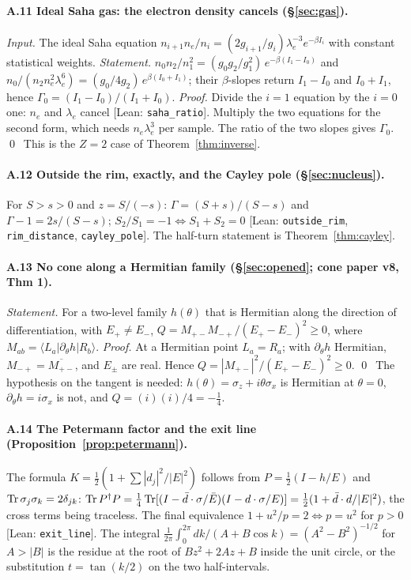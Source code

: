 \paragraph{A.11 Ideal Saha gas: the electron density cancels (§\ref{sec:gas}).}
\emph{Input.} The ideal Saha equation $n_{i+1}n_e/n_i=(2g_{i+1}/g_i)\lambda_e^{-3}e^{-\beta I_i}$ with constant statistical weights.
\emph{Statement.} $n_0n_2/n_1^2=(g_0g_2/g_1^2)\,e^{-\beta(I_1-I_0)}$ and $n_0/(n_2n_e^2\lambda_e^6)=(g_0/4g_2)\,e^{\beta(I_0+I_1)}$; their $\beta$-slopes return $I_1-I_0$ and $I_0+I_1$, hence $\Gamma_0=(I_1-I_0)/(I_1+I_0)$.
\emph{Proof.} Divide the $i=1$ equation by the $i=0$ one: $n_e$ and $\lambda_e$ cancel \textsf{[Lean: \texttt{saha\_ratio}]}. Multiply the two equations for the second form, which needs $n_e\lambda_e^3$ per sample. The ratio of the two slopes gives $\Gamma_0$. \qed\ This is the $Z=2$ case of Theorem~\ref{thm:inverse}.

\paragraph{A.12 Outside the rim, exactly, and the Cayley pole (§\ref{sec:nucleus}).}
For $S>s>0$ and $z=S/(-s)$: $\Gamma=(S+s)/(S-s)$ and $\Gamma-1=2s/(S-s)$; $S_2/S_1=-1\iff S_1+S_2=0$ \textsf{[Lean: \texttt{outside\_rim}, \texttt{rim\_distance}, \texttt{cayley\_pole}]}. The half-turn statement is Theorem~\ref{thm:cayley}.

\paragraph{A.13 No cone along a Hermitian family (§\ref{sec:opened}; cone paper v8, Thm 1).}
\emph{Statement.} For a two-level family $h(\theta)$ that is Hermitian along the direction of differentiation, with $E_+\ne E_-$, $Q=M_{+-}M_{-+}/(E_+-E_-)^2\ge0$, where $M_{ab}=\langle L_a|\partial_\theta h|R_b\rangle$.
\emph{Proof.} At a Hermitian point $L_a=R_a$; with $\partial_\theta h$ Hermitian, $M_{-+}=\overline{M_{+-}}$, and $E_\pm$ are real. Hence $Q=|M_{+-}|^2/(E_+-E_-)^2\ge0$. \qed\ The hypothesis on the tangent is needed: $h(\theta)=\sigma_z+i\theta\sigma_x$ is Hermitian at $\theta=0$, $\partial_\theta h=i\sigma_x$ is not, and $Q=(i)(i)/4=-\tfrac14$.

\paragraph{A.14 The Petermann factor and the exit line (Proposition~\ref{prop:petermann}).}
The formula $K=\tfrac12(1+\sum|d_j|^2/|E|^2)$ follows from $P=\tfrac12(I-h/E)$ and $\operatorname{Tr}\sigma_j\sigma_k=2\delta_{jk}$: $\operatorname{Tr} P^\dagger P=\tfrac14\operatorname{Tr}[(I-\bar d\cdot\sigma/\bar E)(I-d\cdot\sigma/E)]=\tfrac12(1+\bar d\cdot d/|E|^2)$, the cross terms being traceless. The final equivalence $1+u^2/p=2\iff p=u^2$ for $p>0$ \textsf{[Lean: \texttt{exit\_line}]}. The integral $\frac1{2\pi}\int_0^{2\pi}dk/(A+B\cos k)=(A^2-B^2)^{-1/2}$ for $A>|B|$ is the residue at the root of $Bz^2+2Az+B$ inside the unit circle, or the substitution $t=\tan(k/2)$ on the two half-intervals.

